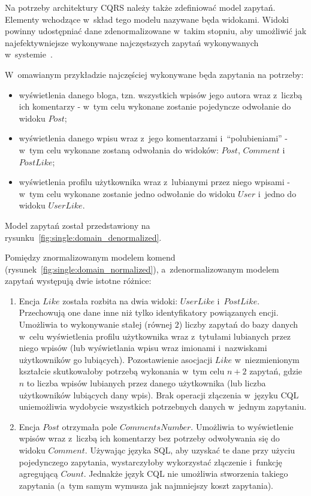 



Na potrzeby architektury CQRS należy także zdefiniować model zapytań.
Elementy wchodzące w~skład tego modelu nazywane będa widokami.
Widoki powinny udostępniać dane zdenormalizowane w~takim stopniu, aby umożliwić jak najefektywniejsze wykonywane najczęstszych zapytań wykonywanych w~systemie~\cite{cassandra_model}.

W~omawianym przykładzie najczęściej wykonywane będa zapytania na potrzeby:

\begin{itemize}
 \item wyświetlenia danego bloga, tzn. wszystkich wpisów jego autora wraz z~liczbą ich komentarzy - w~tym celu wykonane zostanie pojedyncze odwołanie do widoku $Post$;
 \item wyświetlenia danego wpisu wraz z~jego komentarzami i~``polubieniami'' - w~tym celu wykonane zostaną odwołania do widoków: $Post$, $Comment$ i~$PostLike$;
 \item wyświetlenia profilu użytkownika wraz z~lubianymi przez niego wpisami - w~tym celu wykonane zostanie jedno odwołanie do widoku $User$ i~jedno do widoku $UserLike$.
\end{itemize}

Model zapytań został przedstawiony na rysunku~\ref{fig:single:domain_denormalized}.



Pomiędzy znormalizowanym modelem komend (rysunek~\ref{fig:single:domain_normalized}), a~zdenormalizowanym modelem zapytań występują dwie istotne różnice:

\begin{enumerate}
 \item Encja $Like$ została rozbita na dwia widoki: $UserLike$ i~$PostLike$.
 Przechowują one dane inne niż tylko identyfikatory powiązanych encji.
 Umożliwia to wykonywanie stałej (równej $2$) liczby zapytań do bazy danych w~celu wyświetlenia profilu użytkownika wraz z~tytułami lubianych przez niego wpisów (lub wyświetlania wpisu wraz imionami i~nazwiskami użytkowników go lubiących).
 Pozostawienie asocjacji $Like$ w~niezmienionym kształcie skutkowałoby potrzebą wykonania w~tym celu $n + 2$ zapytań, gdzie $n$ to liczba wpisów lubianych przez danego użytkownika (lub liczba użytkowników lubiących dany wpis).
 Brak operacji złączenia w~języku CQL uniemożliwia wydobycie wszystkich potrzebnych danych w~jednym zapytaniu.
 \item Encja $Post$ otrzymała pole $CommentsNumber$.
 Umożliwia to wyświetlenie wpisów wraz z~liczbą ich komentarzy bez potrzeby odwoływania się do widoku $Comment$.
 Używając języka SQL, aby uzyskać te dane przy użyciu pojedynczego zapytania, wystarczyłoby wykorzystać złączenie i~funkcję agregującą $Count$.
 Jednakże język CQL nie umożliwia stworzenia takiego zapytania (a~tym samym wymusza jak najmniejszy koszt zapytania).
\end{enumerate}


